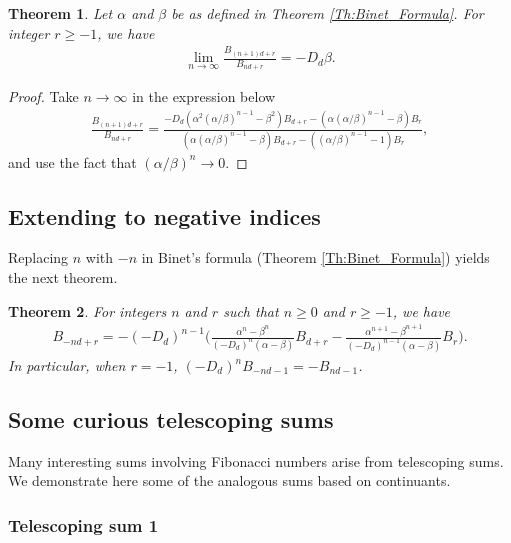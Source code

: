 \documentclass[12pt]{article}
\theoremstyle{plain}
\newtheorem{theorem}{Theorem}
\theoremstyle{definition}
\theoremstyle{remark}
\begin{document}
\begin{theorem} \label{Th:Limit_of_Consecutive_Periods} Let $ \alpha $ and $ \beta $ be as defined in Theorem \ref{Th:Binet_Formula}. For integer $ r \geq -1 $, we have
\begin{align*}
	\lim_{n \rightarrow \infty} \frac{B_{(n + 1)d + r}}{B_{nd + r}} = -D_d \beta.
\end{align*}
\end{theorem}

\begin{proof} Take $ n \longrightarrow \infty $ in the expression below
\begin{align*}
	\frac{B_{(n + 1)d + r}}{B_{nd + r}} = \frac{-D_d (\alpha^2 (\alpha/\beta)^{n - 1} - \beta^2) B_{d + r} - (\alpha (\alpha/\beta)^{n - 1} - \beta) B_r}{(\alpha (\alpha/\beta)^{n - 1} - \beta) B_{d + r} - ((\alpha/\beta)^{n - 1} - 1) B_r},
\end{align*}
and use the fact that $ (\alpha/\beta)^n \longrightarrow 0 $.
\end{proof}

\subsection{Extending to negative indices} \label{Sec:Extending_to_negative_indices}

Replacing $ n $ with $ -n $ in Binet's formula (Theorem \ref{Th:Binet_Formula}) yields the next theorem.
\begin{theorem} For integers $ n $ and $ r $ such that $ n \geq 0 $ and $ r \geq -1 $, we have
\begin{align*}
	B_{-nd + r} = -(-D_d)^{n - 1} \bigg( \frac{\alpha^n - \beta^n}{(-D_d)^n (\alpha - \beta)} B_{d + r} - \frac{\alpha^{n + 1} - \beta^{n + 1}}{(-D_d)^{n - 1} (\alpha - \beta)} B_r \bigg).
\end{align*}
In particular, when $ r = - 1 $, $ (-D_d)^n B_{-nd - 1} = -B_{nd - 1} $.
\end{theorem}

\subsection{Some curious telescoping sums} \label{Sec:Some_Curious_Telescoping_Sums}

Many interesting sums involving Fibonacci numbers arise from telescoping sums. We demonstrate here some of the analogous sums based on continuants.

\subsubsection{Telescoping sum 1}
\end{document}
